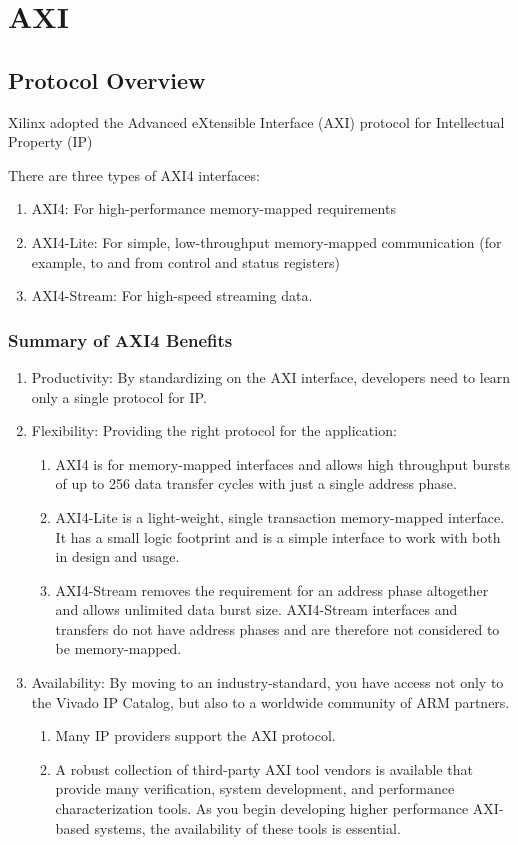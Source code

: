 \section{AXI}
\subsection{Protocol Overview}
Xilinx adopted the Advanced eXtensible Interface (AXI) protocol for Intellectual Property (IP)

There are three types of AXI4 interfaces: 
\begin{enumerate}
    \item AXI4: For high-performance memory-mapped requirements
    \item AXI4-Lite: For simple, low-throughput memory-mapped communication (for example, to and from control and status registers)
    \item AXI4-Stream: For high-speed streaming data.
\end{enumerate}

\subsubsection{Summary of AXI4 Benefits}
\begin{enumerate}
    \item Productivity: By standardizing on the AXI interface, developers need to learn only a single protocol for IP.
    \item Flexibility: Providing the right protocol for the application: 
    \begin{enumerate}
        \item AXI4 is for memory-mapped interfaces and allows high throughput bursts of up to 256 data transfer cycles with just a single address phase. 
        \item AXI4-Lite is a light-weight, single transaction memory-mapped interface. It has a small logic footprint and is a simple interface to work with both in design and usage.
        \item AXI4-Stream removes the requirement for an address phase altogether and allows unlimited data burst size. AXI4-Stream interfaces and transfers do not have address phases and are therefore not considered to be memory-mapped. 
    \end{enumerate}
    \item Availability: By moving to an industry-standard, you have access not only to the Vivado IP Catalog, but also to a worldwide community of ARM partners.
    \begin{enumerate} 
        \item Many IP providers support the AXI protocol.
        \item A robust collection of third-party AXI tool vendors is available that provide many verification, system development, and performance characterization tools. As you begin developing higher performance AXI-based systems, the availability of these tools is essential.
    \end{enumerate}
\end{enumerate}



